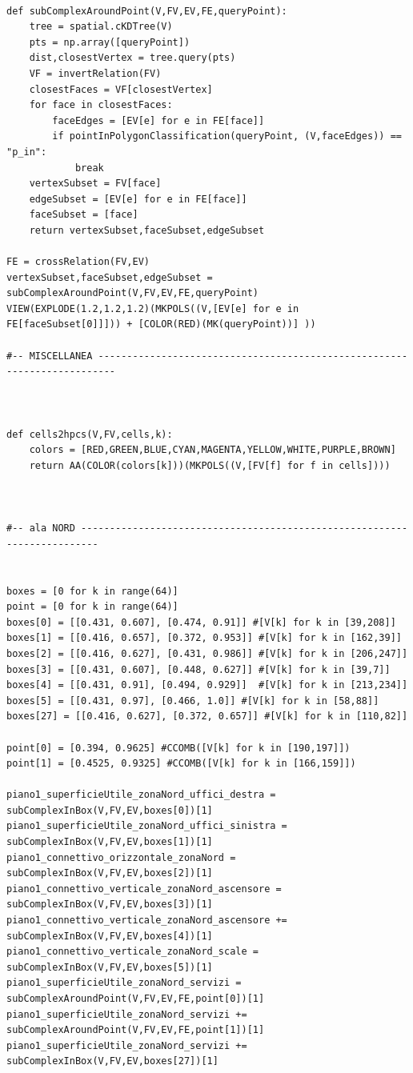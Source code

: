 \documentclass[11pt, oneside]{article}   	%
\begin{document}
\begin{verbatim}
   
def subComplexAroundPoint(V,FV,EV,FE,queryPoint):
    tree = spatial.cKDTree(V)
    pts = np.array([queryPoint])
    dist,closestVertex = tree.query(pts)
    VF = invertRelation(FV)
    closestFaces = VF[closestVertex]
    for face in closestFaces:
    	faceEdges = [EV[e] for e in FE[face]]
        if pointInPolygonClassification(queryPoint, (V,faceEdges)) == "p_in":
            break
    vertexSubset = FV[face]
    edgeSubset = [EV[e] for e in FE[face]]
    faceSubset = [face]
    return vertexSubset,faceSubset,edgeSubset
    
FE = crossRelation(FV,EV)
vertexSubset,faceSubset,edgeSubset = subComplexAroundPoint(V,FV,EV,FE,queryPoint)
VIEW(EXPLODE(1.2,1.2,1.2)(MKPOLS((V,[EV[e] for e in FE[faceSubset[0]]])) + [COLOR(RED)(MK(queryPoint))] ))

#-- MISCELLANEA -------------------------------------------------------------------------
     


def cells2hpcs(V,FV,cells,k): 
    colors = [RED,GREEN,BLUE,CYAN,MAGENTA,YELLOW,WHITE,PURPLE,BROWN]
    return AA(COLOR(colors[k]))(MKPOLS((V,[FV[f] for f in cells])))



#-- ala NORD -------------------------------------------------------------------------


boxes = [0 for k in range(64)]
point = [0 for k in range(64)]
boxes[0] = [[0.431, 0.607], [0.474, 0.91]] #[V[k] for k in [39,208]]
boxes[1] = [[0.416, 0.657], [0.372, 0.953]] #[V[k] for k in [162,39]]
boxes[2] = [[0.416, 0.627], [0.431, 0.986]] #[V[k] for k in [206,247]]
boxes[3] = [[0.431, 0.607], [0.448, 0.627]] #[V[k] for k in [39,7]]
boxes[4] = [[0.431, 0.91], [0.494, 0.929]]  #[V[k] for k in [213,234]]
boxes[5] = [[0.431, 0.97], [0.466, 1.0]] #[V[k] for k in [58,88]]
boxes[27] = [[0.416, 0.627], [0.372, 0.657]] #[V[k] for k in [110,82]]

point[0] = [0.394, 0.9625] #CCOMB([V[k] for k in [190,197]])
point[1] = [0.4525, 0.9325] #CCOMB([V[k] for k in [166,159]])

piano1_superficieUtile_zonaNord_uffici_destra = subComplexInBox(V,FV,EV,boxes[0])[1]
piano1_superficieUtile_zonaNord_uffici_sinistra = subComplexInBox(V,FV,EV,boxes[1])[1]
piano1_connettivo_orizzontale_zonaNord = subComplexInBox(V,FV,EV,boxes[2])[1]
piano1_connettivo_verticale_zonaNord_ascensore = subComplexInBox(V,FV,EV,boxes[3])[1]
piano1_connettivo_verticale_zonaNord_ascensore += subComplexInBox(V,FV,EV,boxes[4])[1]
piano1_connettivo_verticale_zonaNord_scale = subComplexInBox(V,FV,EV,boxes[5])[1]
piano1_superficieUtile_zonaNord_servizi = subComplexAroundPoint(V,FV,EV,FE,point[0])[1]
piano1_superficieUtile_zonaNord_servizi += subComplexAroundPoint(V,FV,EV,FE,point[1])[1]
piano1_superficieUtile_zonaNord_servizi += subComplexInBox(V,FV,EV,boxes[27])[1]


\end{verbatim}
\end{document}
